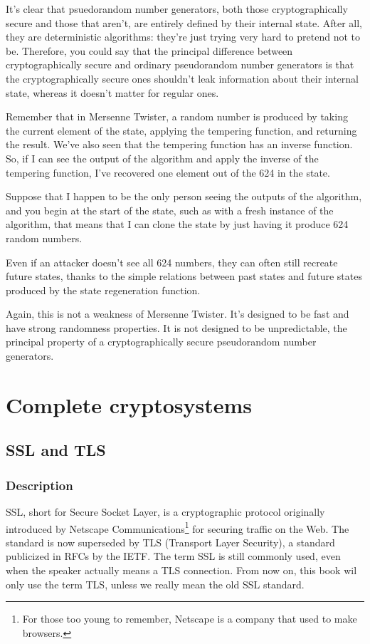 \documentclass[11pt,ebook,table,dvipsnames]{memoir}
\begin{document}
It's clear that psuedorandom number generators, both those
cryptographically secure and those that aren't, are entirely defined
by their internal state. After all, they are deterministic algorithms:
they're just trying very hard to pretend not to be. Therefore, you
could say that the principal difference between cryptographically
secure and ordinary pseudorandom number generators is that the
cryptographically secure ones shouldn't leak information about their
internal state, whereas it doesn't matter for regular ones.

Remember that in Mersenne Twister, a random number is produced by
taking the current element of the state, applying the tempering
function, and returning the result. We've also seen that the tempering
function has an inverse function. So, if I can see the output of the
algorithm and apply the inverse of the tempering function, I've
recovered one element out of the 624 in the state.

Suppose that I happen to be the only person seeing the outputs of the
algorithm, and you begin at the start of the state, such as with a
fresh instance of the algorithm, that means that I can clone the state
by just having it produce 624 random numbers.

Even if an attacker doesn't see all 624 numbers, they can often still
recreate future states, thanks to the simple relations between past
states and future states produced by the state regeneration function.

Again, this is not a weakness of Mersenne Twister. It's designed to be
fast and have strong randomness properties. It is not designed to be
unpredictable, the principal property of a cryptographically secure
pseudorandom number generators.
\part{Complete cryptosystems}
\label{sec-3}
\chapter{SSL and TLS}
\label{sec-3-1}
\section{Description}
\label{sec-3-1-1}

SSL, short for Secure Socket Layer, is a cryptographic protocol
originally introduced by Netscape Communications\footnote{For those too
young to remember, Netscape is a company that used to make browsers.}
for securing traffic on the Web. The standard is now superseded by TLS
(Transport Layer Security), a standard publicized in RFCs by the IETF.
The term SSL is still commonly used, even when the speaker actually
means a TLS connection. From now on, this book wil only use the term
TLS, unless we really mean the old SSL standard.
\end{document}
